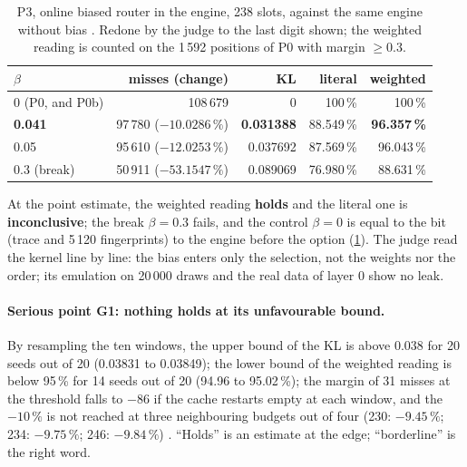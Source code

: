 \begin{table}[tbp]
\centering\small
\caption[P3: the online biased router]{P3, online biased router in the engine, 238 slots, against the same engine without bias \mes. Redone by the judge to the last digit shown; the weighted reading is counted on the 1\,592 positions of P0 with margin $\ge 0.3$.}
\label{t3mim:tab:p3-ligne}
\begin{tabular}{@{}lrrrr@{}}
\toprule
$\beta$ & misses (change) & KL & literal & weighted \\
\midrule
0 (P0, and P0b) & 108\,679 & 0 & 100\,\% & 100\,\% \\
\textbf{0.041} & 97\,780 ($-10.0286\,\%$) & \textbf{0.031388} & 88.549\,\% & \textbf{96.357\,\%} \\
0.05 & 95\,610 ($-12.0253\,\%$) & 0.037692 & 87.569\,\% & 96.043\,\% \\
0.3 (break) & 50\,911 ($-53.1547\,\%$) & 0.089069 & 76.980\,\% & 88.631\,\% \\
\bottomrule
\end{tabular}
\end{table}

At the point estimate, the weighted reading \textbf{holds} and the literal one is \textbf{inconclusive}; the break $\beta = 0.3$ fails, and the control $\beta = 0$ is equal to the bit (trace and 5\,120 fingerprints) to the engine before the option (\cref{t3mim:tab:p3-ligne}). The judge read the kernel line by line: the bias enters only the selection, not the weights nor the order; its emulation on 20\,000 draws and the real data of layer 0 show no leak.

\paragraph{Serious point G1: nothing holds at its unfavourable bound.} By resampling the ten windows, the upper bound of the KL is above 0.038 for 20 seeds out of 20 (0.03831 to 0.03849); the lower bound of the weighted reading is below 95\,\% for 14 seeds out of 20 (94.96 to 95.02\,\%); the margin of 31 misses at the threshold falls to $-86$ if the cache restarts empty at each window, and the $-10\,\%$ is not reached at three neighbouring budgets out of four (230: $-9.45\,\%$; 234: $-9.75\,\%$; 246: $-9.84\,\%$) \mes. ``Holds'' is an estimate at the edge; ``borderline'' is the right word.

